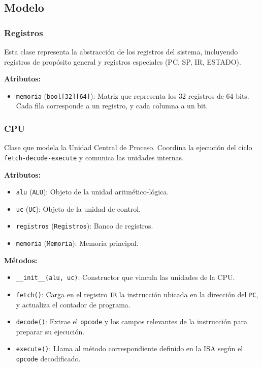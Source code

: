 \documentclass{article}
\begin{document}
\subsection{Modelo}

\subsubsection*{Registros}

Esta clase representa la abstracción de los registros del sistema, incluyendo registros de
propósito general y registros especiales (PC, SP, IR, ESTADO).

\textbf{Atributos:}
\begin{itemize}
  \item \texttt{memoria} (\texttt{bool[32][64]}): Matriz que representa los 32 registros
        de 64 bits. Cada fila corresponde a un registro, y cada columna a un bit.
\end{itemize}

\subsubsection*{CPU}

Clase que modela la Unidad Central de Proceso. Coordina la ejecución del ciclo
\texttt{fetch-decode-execute} y comunica las unidades internas.

\textbf{Atributos:}
\begin{itemize}
  \item \texttt{alu} (\texttt{ALU}): Objeto de la unidad aritmético-lógica.
  \item \texttt{uc} (\texttt{UC}): Objeto de la unidad de control.
  \item \texttt{registros} (\texttt{Registros}): Banco de registros.
  \item \texttt{memoria} (\texttt{Memoria}): Memoria principal.
\end{itemize}

\textbf{Métodos:}
\begin{itemize}
  \item \texttt{\_\_init\_\_(alu, uc)}: Constructor que vincula las unidades de la CPU.
  \item \texttt{fetch()}: Carga en el registro \texttt{IR} la instrucción ubicada en la
        dirección del \texttt{PC}, y actualiza el contador de programa.
  \item \texttt{decode()}: Extrae el \texttt{opcode} y los campos relevantes de
        la instrucción para preparar su ejecución.
  \item \texttt{execute()}: Llama al método correspondiente definido en la ISA
        según el \texttt{opcode} decodificado.
\end{itemize}
\end{document}
